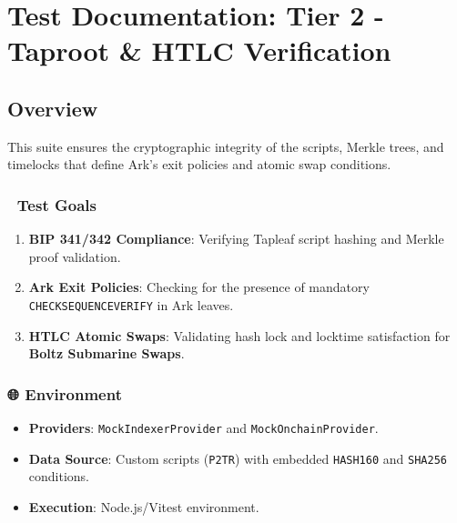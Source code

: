 \documentclass[
]{article}
\author{}
\date{}
\providecommand{\tightlist}{%
  \setlength{\itemsep}{0pt}\setlength{\parskip}{0pt}}
\begin{document}
\hypertarget{test-documentation-tier-2---taproot-htlc-verification}{%
\section{Test Documentation: Tier 2 - Taproot \& HTLC
Verification}\label{test-documentation-tier-2---taproot-htlc-verification}}

\hypertarget{overview}{%
\subsection{Overview}\label{overview}}

This suite ensures the cryptographic integrity of the scripts, Merkle
trees, and timelocks that define Ark's exit policies and atomic swap
conditions.

\hypertarget{test-goals}{%
\subsubsection{🎯 Test Goals}\label{test-goals}}

\begin{enumerate}
\def\labelenumi{\arabic{enumi}.}
\tightlist
\item
  \textbf{BIP 341/342 Compliance}: Verifying Tapleaf script hashing and
  Merkle proof validation.
\item
  \textbf{Ark Exit Policies}: Checking for the presence of mandatory
  \texttt{CHECKSEQUENCEVERIFY} in Ark leaves.
\item
  \textbf{HTLC Atomic Swaps}: Validating hash lock and locktime
  satisfaction for \textbf{Boltz Submarine Swaps}.
\end{enumerate}

\hypertarget{environment}{%
\subsubsection{🌐 Environment}\label{environment}}

\begin{itemize}
\tightlist
\item
  \textbf{Providers}: \texttt{MockIndexerProvider} and
  \texttt{MockOnchainProvider}.
\item
  \textbf{Data Source}: Custom scripts (\texttt{P2TR}) with embedded
  \texttt{HASH160} and \texttt{SHA256} conditions.
\item
  \textbf{Execution}: Node.js/Vitest environment.
\end{itemize}
\end{document}
